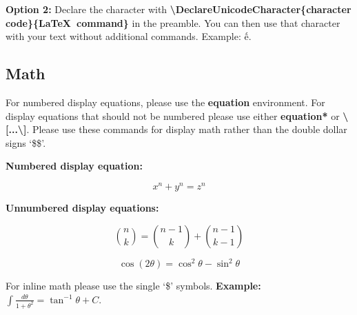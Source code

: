 \documentclass[hasAbstract,authorBox]{csmagazine}
\begin{document}

\textbf{Option 2:} Declare the character with \textbf{\textbackslash{}DeclareUnicodeCharacter\{character code\}\{\LaTeX\ command\}} in the preamble. You can then use that character with your text without additional commands. Example: ế.




\subsection{Math}

For numbered display equations, please use the \textbf{equation} environment. For display equations that should not be numbered please use either \textbf{equation*}  or \textbf{\textbackslash[...\textbackslash]}. Please use these commands for display math rather than the double dollar signs `\$\$'.

\textbf{Numbered display equation:}

\begin{equation}
x^n + y^n = z^n
\end{equation}

\textbf{Unnumbered display equations:}

\[\binom{n}{k} =\binom{n-1}{k} + \binom{n-1}{k-1}\]


\begin{equation*}
\cos (2\theta) = \cos^2 \theta - \sin^2 \theta
\end{equation*}


For inline math please use the single `\$' symbols. \textbf{Example:} $\int\frac{d\theta} {1+\theta^2}=\tan^{-1} \theta+C$.
\end{document}
